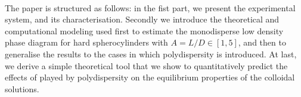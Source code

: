 \documentclass[journal=jacsat,manuscript=article]{achemso}
\begin{document}
 \
%
% 
%


The paper is structured as follows: in the fist part, we present the experimental system, and its characterisation. Secondly we introduce the theoretical and computational modeling used first to  estimate the monodisperse low density phase diagram for hard spherocylinders with  $A=L/D \in [1,5]$, and then to generalise the results to the cases in which polydispersity is introduced. 
At last,  we derive a simple theoretical tool that we show to quantitatively predict the effects of played by polydispersity on the equilibrium properties of the colloidal solutions.  
\end{document}

